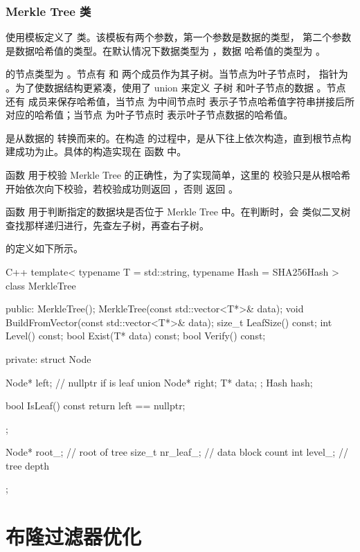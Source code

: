 \documentclass{mydoc}
\begin{document}
\subsubsection{Merkle Tree 类}

使用模板定义了  类。该模板有两个参数，第一个参数是数据的类型，
第二个参数是数据哈希值的类型。在默认情况下数据类型为 ，数据
哈希值的类型为 。

 的节点类型为 。节点有 
和  两个成员作为其子树。当节点为叶子节点时， 指针为
。为了使数据结构更紧凑，使用了 union 来定义  子树
和叶子节点的数据 。节点还有  成员来保存哈希值，当节点
为中间节点时  表示子节点哈希值字符串拼接后所对应的哈希值；当节点
为叶子节点时  表示叶子节点数据的哈希值。

 是从数据的  转换而来的。在构造 
的过程中，是从下往上依次构造，直到根节点构建成功为止。具体的构造实现在
函数  中。

函数  用于校验 Merkle Tree 的正确性，为了实现简单，这里的
校验只是从根哈希开始依次向下校验，若校验成功则返回 ，否则
返回 。

函数  用于判断指定的数据块是否位于 Merkle Tree 中。在判断时，会
类似二叉树查找那样递归进行，先查左子树，再查右子树。

 的定义如下所示。

\begin{codes}{C++}
template< typename T = std::string, typename Hash = SHA256Hash >
class MerkleTree {
 public:
  MerkleTree();
  MerkleTree(const std::vector<T*>& data);
  void BuildFromVector(const std::vector<T*>& data);
  size_t LeafSize() const;
  int Level() const;
  bool Exist(T* data) const;
  bool Verify() const;

 private:
  struct Node {
    Node*  left;    // nullptr if is leaf
    union {
      Node*  right;
      T*     data;
    };
    Hash hash;

    bool IsLeaf() const { return left == nullptr; }
  };

  Node*     root_;    // root of tree
  size_t    nr_leaf_; // data block count
  int       level_;   // tree depth
};
\end{codes}

\section{布隆过滤器优化}
\end{document}
